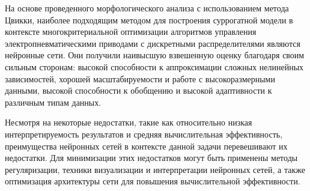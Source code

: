 На основе проведенного морфологического анализа с использованием метода
Цвикки, наиболее подходящим методом для построения суррогатной модели
в контексте многокритериальной оптимизации алгоритмов управления
электропневматическими приводами с дискретными распределителями
являются нейронные сети. Они получили наивысшую взвешенную оценку
благодаря своим сильным сторонам: высокой способности к аппроксимации
сложных нелинейных зависимостей, хорошей масштабируемости и работе с
высокоразмерными данными, высокой способности к обобщению и высокой
адаптивности к различным типам данных.

Несмотря на некоторые недостатки, такие как относительно низкая интерпретируемость
результатов и средняя вычислительная эффективность,
преимущества нейронных сетей в контексте данной задачи перевешивают
их недостатки. Для минимизации этих недостатков могут быть применены методы
регуляризации, техники визуализации и интерпретации нейронных сетей, а
также оптимизация архитектуры сети для повышения вычислительной эффективности.